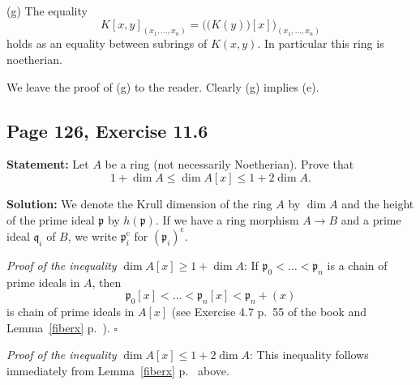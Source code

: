 \documentclass[parskip=half,fontsize=12pt]{scrartcl}%
\newcommand{\oo}{\operatorname}\newcommand{\ooo}{\operatorname*}
\newcommand{\mf}{\mathfrak}
\newcommand{\ppp}{\mf p}
\newcommand{\qqq}{\mf q}
\newcommand{\Spec}{\operatorname{Spec}}\newcommand{\Sp}{\operatorname{Spec}}
\newtheorem{note}[thm]{Note}
\begin{document}
(g) The equality 
$$
K[x,y]_{(x_1,\ldots,x_n)}=\Big(\big(K(y)\big)[x]\Big)_{(x_1,\ldots,x_n)}
$$ 
holds as an equality between subrings of $K(x,y)$. In particular this ring is noetherian. 

We leave the proof of (g) to the reader. Clearly (g) implies (e). 

\subsection{Page 126, Exercise 11.6}\label{116}%

\textbf{Statement:} Let $A$ be a ring (not necessarily Noetherian). Prove that 
$$
1+\dim A\le\dim A[x]\le1+2\dim A.
$$

\textbf{Solution:} We denote the Krull dimension of the ring $A$ by $\dim A$ and the height of the prime ideal $\ppp$ by $h(\ppp)$. If we have a ring morphism $A\to B$ and a prime ideal $\qqq_i$ of $B$, we write $\ppp_i^{\oo c}$ for $(\ppp_i)^{\oo c}$. 




\emph{Proof of the inequality} $\dim A[x]\ge1+\dim A$: If 
$
\ppp_0<\dots<\ppp_n
$ 
is a chain of prime ideals in $A$, then 
$$
\ppp_0[x]<\dots<\ppp_n[x]<\ppp_n+(x)
$$ 
is chain of prime ideals in $A[x]$ (see Exercise 4.7 p.~55 of the book and Lemma~\ref{fiberx} p.~\pageref{fiberx}). $\square$

\emph{Proof of the inequality} $\dim A[x]\le1+2\dim A$: This inequality follows immediately from Lemma~\ref{fiberx} p.~\pageref{fiberx} above.
\end{document}
